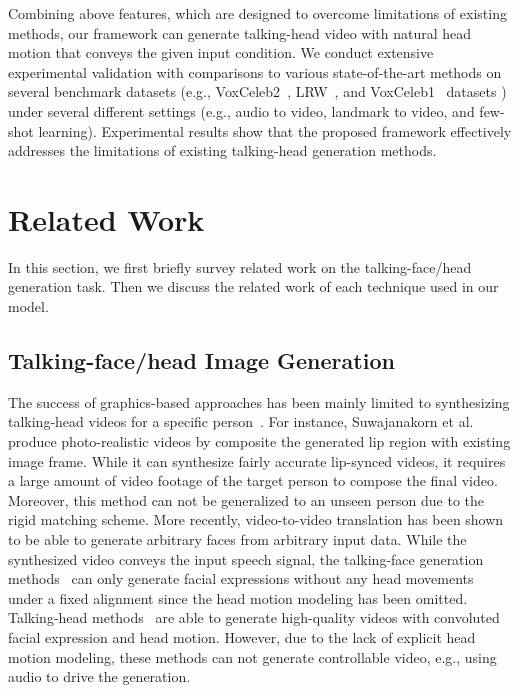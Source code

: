 \documentclass[runningheads]{llncs}
\begin{document}
Combining above features, which are designed to overcome limitations of existing methods, our framework can generate talking-head video with natural head motion that conveys the given input condition. We conduct extensive experimental validation with comparisons to various state-of-the-art methods on several benchmark datasets (e.g., VoxCeleb2~\cite{Chung18b}, LRW~\cite{Chung16}, and VoxCeleb1~\cite{Nagrani17} datasets ) under several different settings (e.g., audio to video, landmark to video, and few-shot learning). Experimental results show that the proposed framework effectively addresses the limitations of existing talking-head generation methods.

\section{Related Work}
\label{sec:related}
In this section, we first briefly survey related work on the talking-face/head generation task. Then we discuss the related work of each technique used in our model.

\subsection{Talking-face/head Image Generation}
\label{subsec:talking-syn}
The success of graphics-based approaches has been mainly limited to synthesizing talking-head videos for a specific person~\cite{garrido2015vdub,bregler1997video,chang2005transferable,liu2011realistic,suwajanakorn2017synthesizing}. For instance, Suwajanakorn et al.~\cite{suwajanakorn2017synthesizing} produce photo-realistic videos by composite the generated lip region with existing image frame. While it can synthesize fairly accurate lip-synced videos, it requires a large amount of video footage of the target person to compose the final video. Moreover, this method can not be generalized to an unseen person due to the rigid matching scheme. More recently, video-to-video translation has been shown to be able to generate arbitrary faces from arbitrary input data. While the synthesized video conveys the input speech signal, the talking-face generation methods~\cite{chung2017you,zhou2019talking,ijcai2019-129,Vougioukas2019,chen2019hierarchical} can only generate facial expressions without any head movements under a fixed alignment since the head motion modeling has been omitted. Talking-head methods~\cite{zakharov2019few,chen2019hierarchical,wiles2018x2face} are able to generate high-quality videos with convoluted facial expression and head motion. However, due to the lack of explicit head motion modeling, these methods can not generate controllable video, e.g., using audio to drive the generation. 
\end{document}

